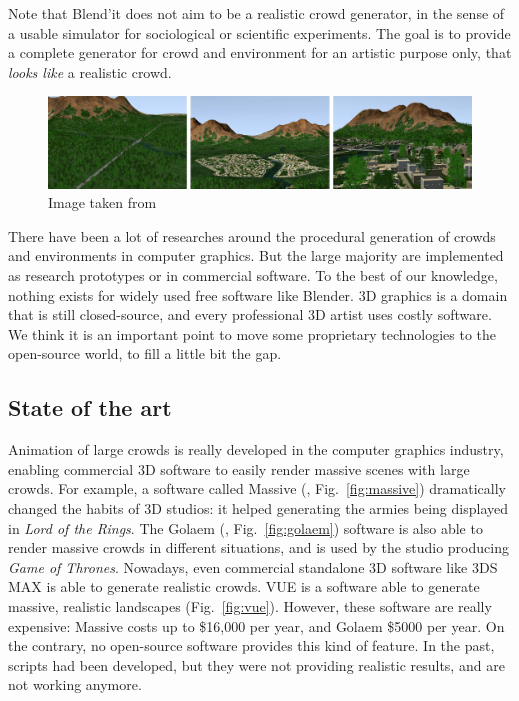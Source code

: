 Note that Blend'it does not aim to be a realistic crowd generator, in
the sense of a usable simulator for sociological or scientific
experiments. The goal is to provide a complete generator for crowd and
environment for an artistic purpose only, that \textit{looks like} a
realistic crowd.

\begin{figure}[h]
  \includegraphics[width=15cm]{img/env1.jpg}
  \caption{Image taken from \cite{DeclarativeArchitecture}}
  \label{fig:env}
\end{figure}


There have been a lot of researches around the procedural generation
of crowds and environments in computer graphics. But the large
majority are implemented as research prototypes or in commercial
software. To the best of our knowledge, nothing exists for widely used
free software like Blender. 3D graphics is a domain that is still
closed-source, and every professional 3D artist uses costly
software. We think it is an important point to move some proprietary
technologies to the open-source world, to fill a little bit the gap.

\subsection{State of the art}



Animation of large crowds is really developed in the computer graphics
industry, enabling commercial 3D software to easily render massive
scenes with large crowds. For example, a software called Massive
(\cite{Massive}, Fig.~\ref{fig:massive}) dramatically changed the
habits of 3D studios: it helped generating the armies being displayed
in \textit{Lord of the Rings}. The Golaem (\cite{Golaem},
Fig.~\ref{fig:golaem}) software is also able to render massive crowds
in different situations, and is used by the studio producing
\textit{Game of Thrones}. Nowadays, even commercial standalone 3D
software like 3DS MAX\cite{3dsmax} is able to generate realistic
crowds. VUE is a software able to generate massive, realistic
landscapes (Fig.~\ref{fig:vue}). However, these software are really
expensive: Massive costs up to \$16,000 per year, and Golaem \$5000
per year. On the contrary, no open-source software provides this
kind of feature. In the past, scripts had been developed, but they
were not providing realistic results, and are not working anymore.


